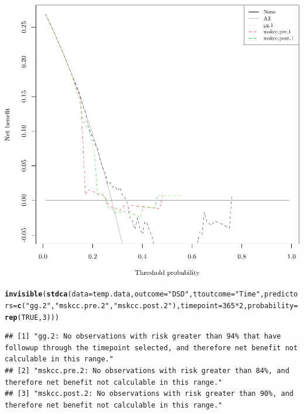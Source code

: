 \documentclass{article}\usepackage[]{graphicx}\usepackage[]{color}
\makeatletter
\def\maxwidth{ %
  \ifdim\Gin@nat@width>\linewidth
    \linewidth
  \else
    \Gin@nat@width
  \fi
}
\newcommand{\hlnum}[1]{\textcolor[rgb]{0.686,0.059,0.569}{#1}}%
\newcommand{\hlstr}[1]{\textcolor[rgb]{0.192,0.494,0.8}{#1}}%
\newcommand{\hlopt}[1]{\textcolor[rgb]{0,0,0}{#1}}%
\newcommand{\hlstd}[1]{\textcolor[rgb]{0.345,0.345,0.345}{#1}}%
\newcommand{\hlkwc}[1]{\textcolor[rgb]{0.333,0.667,0.333}{#1}}%
\newcommand{\hlkwd}[1]{\textcolor[rgb]{0.737,0.353,0.396}{\textbf{#1}}}%
\newenvironment{kframe}{%
 \def\at@end@of@kframe{}%
 \ifinner\ifhmode%
  \def\at@end@of@kframe{\end{minipage}}%
  \begin{minipage}{\columnwidth}%
 \fi\fi%
 \def\FrameCommand##1{\hskip\@totalleftmargin \hskip-\fboxsep
 \colorbox{shadecolor}{##1}\hskip-\fboxsep
     \hskip-\linewidth \hskip-\@totalleftmargin \hskip\columnwidth}%
 \MakeFramed {\advance\hsize-\width
   \@totalleftmargin\z@ \linewidth\hsize
   \@setminipage}}%
 {\par\unskip\endMakeFramed%
 \at@end@of@kframe}
\newenvironment{knitrout}{}{} %
\makeatother
\begin{document}
\begin{knitrout}
{\centering \includegraphics[width=\maxwidth]{figure/07-model-selection-dca-7} 

}


\begin{kframe}\begin{alltt}
\hlkwd{invisible}\hlstd{(}\hlkwd{stdca}\hlstd{(}\hlkwc{data} \hlstd{= temp.data,} \hlkwc{outcome} \hlstd{=} \hlstr{"DSD"}\hlstd{,} \hlkwc{ttoutcome} \hlstd{=} \hlstr{"Time"}\hlstd{,} \hlkwc{predictors} \hlstd{=} \hlkwd{c}\hlstd{(}\hlstr{"gg.2"}\hlstd{,} \hlstr{"mskcc.pre.2"}\hlstd{,} \hlstr{"mskcc.post.2"}\hlstd{),} \hlkwc{timepoint} \hlstd{=} \hlnum{365}\hlopt{*}\hlnum{2}\hlstd{,} \hlkwc{probability} \hlstd{=} \hlkwd{rep}\hlstd{(}\hlnum{TRUE}\hlstd{,} \hlnum{3}\hlstd{)))}
\end{alltt}
\begin{verbatim}
## [1] "gg.2: No observations with risk greater than 94% that have followup through the timepoint selected, and therefore net benefit not calculable in this range."
## [2] "mskcc.pre.2: No observations with risk greater than 84%, and therefore net benefit not calculable in this range."                                           
## [3] "mskcc.post.2: No observations with risk greater than 90%, and therefore net benefit not calculable in this range."
\end{verbatim}
\end{kframe}


\end{knitrout}
\end{document}
